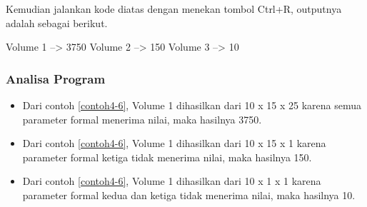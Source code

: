 Kemudian jalankan kode diatas dengan menekan tombol Ctrl+R, outputnya
adalah sebagai berikut.
\begin{lcverbatim}
Volume 1 --> 3750
Volume 2 --> 150
Volume 3 -->  10
\end{lcverbatim}


\subsubsection*{Analisa Program}

\begin{itemize}

\item
  Dari contoh \ref{contoh4-6}, Volume 1 dihasilkan dari 10 x 15 x 25 karena
  semua parameter formal menerima nilai, maka hasilnya 3750.
\item
  Dari contoh \ref{contoh4-6}, Volume 1 dihasilkan dari 10 x 15 x 1 karena
  parameter formal ketiga tidak menerima nilai, maka hasilnya 150.
\item
  Dari contoh \ref{contoh4-6}, Volume 1 dihasilkan dari 10 x 1 x 1 karena
  parameter formal kedua dan ketiga tidak menerima nilai, maka hasilnya
  10.
\end{itemize}
